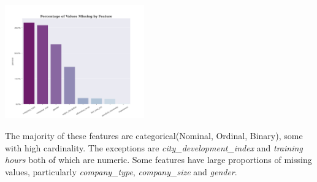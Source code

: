 
\begin{center}
\includegraphics[width=0.45\textwidth]{missing_values}
\end{center}

The majority of these features are categorical(Nominal, Ordinal, Binary), some with high cardinality. The exceptions are \emph{city\_development\_index} and \emph{training hours} both of which are numeric. Some features have large proportions of missing values, particularly \emph{company\_type}, \emph{company\_size} and \emph{gender}.

\vspace{250px}



